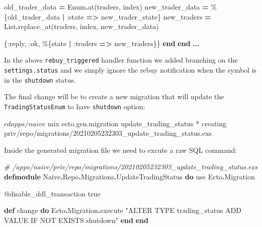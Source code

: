 \documentclass[
]{book}
\newenvironment{Shaded}{\begin{snugshade}}{\end{snugshade}}
\newcommand{\CommentTok}[1]{\textcolor[rgb]{0.56,0.35,0.01}{\textit{#1}}}
\newcommand{\ConstantTok}[1]{\textcolor[rgb]{0.00,0.00,0.00}{#1}}
\newcommand{\ExtensionTok}[1]{#1}
\newcommand{\ImportTok}[1]{#1}
\newcommand{\KeywordTok}[1]{\textcolor[rgb]{0.13,0.29,0.53}{\textbf{#1}}}
\newcommand{\NormalTok}[1]{#1}
\newcommand{\OperatorTok}[1]{\textcolor[rgb]{0.81,0.36,0.00}{\textbf{#1}}}
\newcommand{\OtherTok}[1]{\textcolor[rgb]{0.56,0.35,0.01}{#1}}
\newcommand{\StringTok}[1]{\textcolor[rgb]{0.31,0.60,0.02}{#1}}
\newcommand{\VariableTok}[1]{\textcolor[rgb]{0.00,0.00,0.00}{#1}}
\begin{document}
\begin{Shaded}
\begin{Highlighting}[]
\NormalTok{        old\_trader\_data }\OperatorTok{=} \ConstantTok{Enum}\OperatorTok{.}\NormalTok{at(traders, index)}
\NormalTok{        new\_trader\_data }\OperatorTok{=}\NormalTok{ \%\{old\_trader\_data }\OperatorTok{|} \VariableTok{:state} \OperatorTok{=\textgreater{}}\NormalTok{ new\_trader\_state\}}
\NormalTok{        new\_traders }\OperatorTok{=} \ConstantTok{List}\OperatorTok{.}\NormalTok{replace\_at(traders, index, new\_trader\_data)}

\NormalTok{        \{}\VariableTok{:reply}\NormalTok{, }\VariableTok{:ok}\NormalTok{, \%\{state }\OperatorTok{|} \VariableTok{:traders} \OperatorTok{=\textgreater{}}\NormalTok{ new\_traders\}\}}
    \KeywordTok{end}
  \KeywordTok{end}
  \OperatorTok{...}
\end{Highlighting}
\end{Shaded}

In the above \texttt{rebuy\_triggered} handler function we added branching on the \texttt{settings.status} and we simply ignore the rebuy notification when the symbol is in the \texttt{shutdown} status.

The final change will be to create a new migration that will update the \texttt{TradingStatusEnum} to have \texttt{shutdown} option:

\begin{Shaded}
\begin{Highlighting}[]
\ExtensionTok{$}\NormalTok{ cd apps/naive }
\ExtensionTok{$}\NormalTok{ mix ecto.gen.migration update\_trading\_status}
\ExtensionTok{*}\NormalTok{ creating priv/repo/migrations/20210205232303\_update\_trading\_status.exs}
\end{Highlighting}
\end{Shaded}

Inside the generated migration file we need to excute a raw SQL command:

\begin{Shaded}
\begin{Highlighting}[]
\CommentTok{\# /apps/naive/priv/repo/migrations/20210205232303\_update\_trading\_status.exs}
\KeywordTok{defmodule} \ConstantTok{Naive}\OperatorTok{.}\ConstantTok{Repo}\OperatorTok{.}\ConstantTok{Migrations}\OperatorTok{.}\ConstantTok{UpdateTradingStatus} \KeywordTok{do}
  \ImportTok{use} \ConstantTok{Ecto}\OperatorTok{.}\ConstantTok{Migration}

  \OtherTok{@disable\_ddl\_transaction} \ConstantTok{true}

  \KeywordTok{def}\NormalTok{ change }\KeywordTok{do}
    \ConstantTok{Ecto}\OperatorTok{.}\ConstantTok{Migration}\OperatorTok{.}\NormalTok{execute }\StringTok{"ALTER TYPE trading\_status ADD VALUE IF NOT EXISTS \textquotesingle{}shutdown\textquotesingle{}"}
  \KeywordTok{end}
\KeywordTok{end}
\end{Highlighting}
\end{Shaded}
\end{document}
